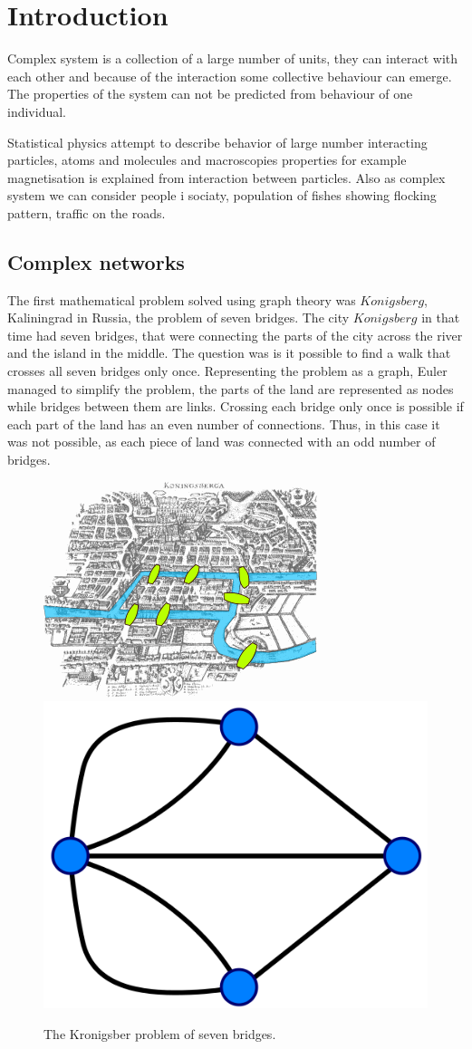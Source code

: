 \chapter{Introduction} %

\label{Introduction} %

Complex system is a collection of a large number of units, they can interact with each other and because of the interaction some collective behaviour can emerge. The properties of the system can not be predicted from behaviour of one individual. 

Statistical physics attempt to describe behavior of large number interacting particles, atoms and molecules and macroscopies properties for example magnetisation is explained from interaction between particles. Also as complex system we can consider people i sociaty, population of fishes showing flocking pattern, traffic on the roads. 

\section{Complex networks}

The first mathematical problem solved using graph theory was $Konigsberg$, Kaliningrad in Russia, the problem of seven bridges. The city $Konigsberg$ in that time had seven bridges, that were connecting the parts of the city across the river and the island in the middle. The question was is it possible to find a walk that crosses all seven bridges only once. Representing the problem as a graph, Euler managed to simplify the problem, the parts of the land are represented as nodes while bridges between them are links. Crossing each bridge only once is possible if each part of the land has an even number of connections. Thus, in this case it was not possible, as each piece of land was connected with an odd number of bridges.

\begin{figure}[h!]
	\centering
	\includegraphics[width=0.3\linewidth]{Figures/Konigsberg_bridges.png} \hspace{2cm}
	\includegraphics[width=0.3\linewidth]{Figures/Konigsberg_graph.png}
	\caption{The Kronigsber problem of seven bridges.}
	\label{fig:Krgraph}
\end{figure}

